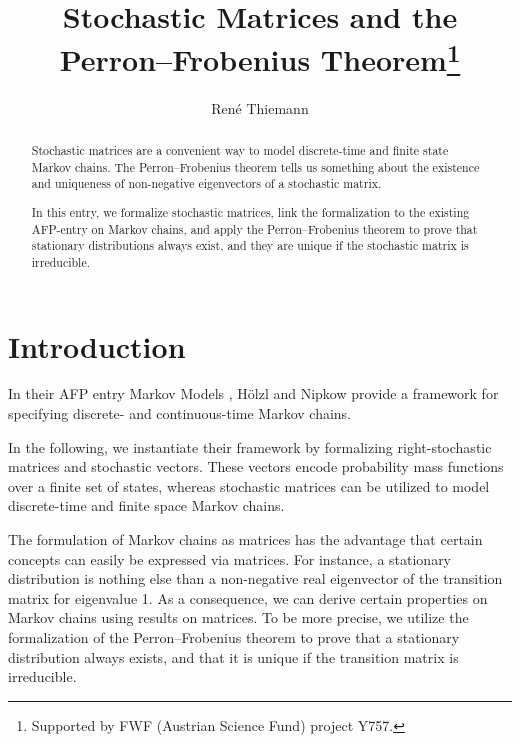 \documentclass[11pt,a4paper]{article}
\begin{document}
\title{Stochastic Matrices and the Perron--Frobenius Theorem\footnote{Supported by FWF (Austrian Science Fund) project Y757.}}
\author{Ren\'e Thiemann}
\maketitle

\begin{abstract}
Stochastic matrices are a convenient way to model discrete-time and finite
state Markov chains. The Perron--Frobenius theorem tells us something about
the existence and uniqueness of non-negative eigenvectors of a stochastic matrix.

In this entry, we formalize stochastic matrices, link the formalization 
to the existing AFP-entry on Markov chains, and apply the Perron--Frobenius
theorem to prove that stationary distributions always exist, and they are
unique if the stochastic matrix is irreducible. 
\end{abstract}

\tableofcontents

\section{Introduction}

In their AFP entry Markov Models \cite{Markov_Models-AFP}, H\"olzl and Nipkow
provide a framework for specifying discrete- and continuous-time Markov chains.

In the following, we instantiate their framework by formalizing right-stochastic
matrices and stochastic vectors. These vectors encode probability mass functions
over a finite set of states, whereas stochastic matrices can be utilized to model 
discrete-time and finite space Markov chains. 

The formulation of Markov chains as matrices has the 
advantage that certain concepts
can easily be expressed via matrices. For instance, a stationary distribution is nothing
else than a non-negative real eigenvector of the transition matrix for eigenvalue 1.
As a consequence, we can derive certain properties on Markov chains using results on
matrices. To be more precise, we utilize the formalization of the Perron--Frobenius theorem
\cite{Perron_Frobenius-AFP} to prove that a stationary distribution always exists, and that it is unique if
the transition matrix is irreducible. 






\end{document}
